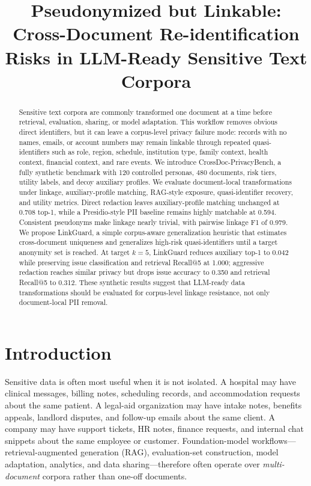 \documentclass{article}
\title{Pseudonymized but Linkable:\\
Cross-Document Re-identification Risks in LLM-Ready Sensitive Text Corpora}
\author{}
\date{}
\newcommand{\method}{LinkGuard}
\newcommand{\bench}{CrossDoc-PrivacyBench}
\begin{document}
\ifcolmsubmission
\linenumbers
\fi
\maketitle

\begin{abstract}
Sensitive text corpora are commonly transformed one document at a time before retrieval, evaluation, sharing, or model adaptation.
This workflow removes obvious direct identifiers, but it can leave a corpus-level privacy failure mode: records with no names, emails, or account numbers may remain linkable through repeated quasi-identifiers such as role, region, schedule, institution type, family context, health context, financial context, and rare events.
We introduce \bench, a fully synthetic benchmark with 120 controlled personas, 480 documents, risk tiers, utility labels, and decoy auxiliary profiles.
We evaluate document-local transformations under linkage, auxiliary-profile matching, RAG-style exposure, quasi-identifier recovery, and utility metrics.
Direct redaction leaves auxiliary-profile matching unchanged at 0.708 top-1, while a Presidio-style PII baseline remains highly matchable at 0.594.
Consistent pseudonyms make linkage nearly trivial, with pairwise linkage F1 of 0.979.
We propose \method, a simple corpus-aware generalization heuristic that estimates cross-document uniqueness and generalizes high-risk quasi-identifiers until a target anonymity set is reached.
At target $k=5$, \method{} reduces auxiliary top-1 to 0.042 while preserving issue classification and retrieval Recall@5 at 1.000; aggressive redaction reaches similar privacy but drops issue accuracy to 0.350 and retrieval Recall@5 to 0.312.
These synthetic results suggest that LLM-ready data transformations should be evaluated for corpus-level linkage resistance, not only document-local PII removal.
\end{abstract}

\section{Introduction}

Sensitive data is often most useful when it is not isolated.
A hospital may have clinical messages, billing notes, scheduling records, and accommodation requests about the same patient.
A legal-aid organization may have intake notes, benefits appeals, landlord disputes, and follow-up emails about the same client.
A company may have support tickets, HR notes, finance requests, and internal chat snippets about the same employee or customer.
Foundation-model workflows---retrieval-augmented generation (RAG), evaluation-set construction, model adaptation, analytics, and data sharing---therefore often operate over \emph{multi-document} corpora rather than one-off documents.
\end{document}
